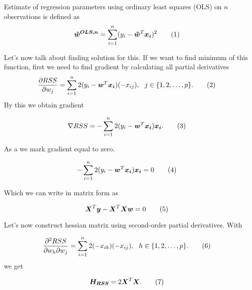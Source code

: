\begin{definition} Estimate of regression parameters using ordinary least squares (OLS) on $n$ observations is defined as
    \begin{equation}
        \vec{\hat{w}^{OLS, n}} =  \sum\limits_{i=1}^n (y_i - \vec{\tilde{w}}^T\vec{x_i})^2 \numberthis
    \end{equation}
\end{definition}

Let's now talk about finding solution for this. If we want to find minimum of this function, first we need to find gradient by calculating all partial derivatives
\begin{equation}
    \frac{\partial {RSS} }{\partial w_j} = \sum\limits_{i=1}^n 2(y_i - \vec{w}^T\vec{x_i})(-x_{ij}) \\, \ \ j \in \{{1,2,\ldots,p\}}. \numberthis
\end{equation}
By this we obtain gradient 

\begin{equation}
    \nabla RSS = -\sum\limits_{i=1}^n 2(y_i - \vec{w}^T\vec{x_i})\vec{x_i}. \numberthis
\end{equation}

As a  we mark gradient equal to zero.

\begin{equation}
    -\sum\limits_{i=1}^n 2(y_i - \vec{w}^T\vec{x_i})\vec{x_i} = 0 \numberthis
\end{equation}

Which we can write in matrix form as 

\begin{equation}
    \vec{X}^T\vec{y} - \vec{X}^T\vec{X}\vec{w} = 0 \numberthis  \label{abcd}
\end{equation}


Let's now construct hessian matrix using second-order partial derivatives. With

\begin{equation}
    \frac{\partial^2{RSS} }{\partial w_h\partial w_j} = \sum\limits_{i=1}^n 2(- x_{ik})(-x_{ij}) \\, \ \ h \in \{{1,2,\ldots,p\}}. \numberthis
\end{equation}
we get 

\begin{equation}
    \vec{H_{RSS}} = 2\vec{X}^T\vec{X}. \numberthis 
\end{equation}

